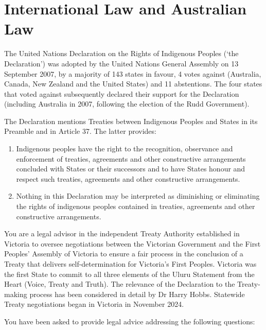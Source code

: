 \section{International Law and Australian Law}
\begin{tutorialquestion}
    \flushleft

    The United Nations Declaration on the Rights of Indigenous Peoples (`the Declaration') was adopted by the United Nations General Assembly on 13 September 2007, by a majority of 143 states in favour, 4 votes against (Australia, Canada, New Zealand and the United States) and 11 abstentions. The four states that voted against subsequently declared their support for the Declaration (including Australia in 2007, following the election of the Rudd Government).
    
    \vspace{\baselineskip}

    The Declaration mentions Treaties between Indigenous Peoples and States in its Preamble and in Article 37. The latter provides:
    \begin{enumerate}
        \item Indigenous peoples have the right to the recognition, observance and enforcement of treaties, agreements and other constructive arrangements concluded with States or their successors and to have States honour and respect such treaties, agreements and other constructive arrangements.
        \item Nothing in this Declaration may be interpreted as diminishing or eliminating the rights of indigenous peoples contained in treaties, agreements and other constructive arrangements.
    \end{enumerate}

    You are a legal advisor in the independent Treaty Authority established in Victoria to oversee negotiations between the Victorian Government and the First Peoples' Assembly of Victoria to ensure a fair process in the conclusion of a Treaty that delivers self-determination for Victoria's First Peoples. Victoria was the first State to commit to all three elements of the Uluru Statement from the Heart (Voice, Treaty and Truth). The relevance of the Declaration to the Treaty-making process has been considered in detail by Dr Harry Hobbs. Statewide Treaty negotiations began in Victoria in November 2024.

    \vspace{\baselineskip}

    You have been asked to provide legal advice addressing the following questions:


\end{tutorialquestion}
